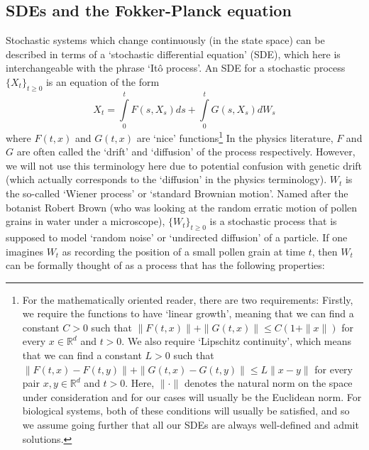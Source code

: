\subsection{SDEs and the Fokker-Planck equation}\label{intro_SDE}
Stochastic systems which change continuously (in the state space) can be described in terms of a `stochastic differential equation' (SDE), which here is interchangeable with the phrase `It\^o process'. An SDE for a stochastic process $\{X_t\}_{t \geq 0}$ is an equation of the form
\begin{equation}
\label{ito_SDE_integral}
X_t = \int\limits_{0}^{t} F(s,X_s)ds + \int\limits_{0}^{t} G(s,X_s)dW_s
\end{equation}
where $F(t,x)$ and $G(t,x)$ are `nice' functions\footnote{For the mathematically oriented reader, there are two requirements: Firstly, we require the functions to have `linear growth', meaning that we can find a constant $C > 0$ such that $\|F(t,x)\| + \|G(t,x)\| \leq C(1+\|x\|)$ for every $x \in \mathbb{R}^{d}$ and $t > 0$. We also require `Lipschitz continuity', which means that we can find a constant $L > 0$ such that $\|F(t,x) - F(t,y)\| + \|G(t,x)-G(t,y)\| \leq L\|x-y\|$ for every pair $x,y \in \mathbb{R}^d$ and $t > 0$. Here, $\|\cdot\|$ denotes the natural norm on the space under consideration and for our cases will usually be the Euclidean norm. For biological systems, both of these conditions will usually be satisfied, and so we assume going further that all our SDEs are always well-defined and admit solutions.} In the physics literature, $F$ and $G$ are often called the `drift' and `diffusion' of the process respectively. However, we will not use this terminology here due to  potential confusion with genetic drift (which actually corresponds to the `diffusion' in the physics terminology). $W_t$ is the so-called `Wiener process' or `standard Brownian motion'. Named after the botanist Robert Brown (who was looking at the random erratic motion of pollen grains in water under a microscope), $\{W_t\}_{t \geq 0}$ is a stochastic process that is supposed to model `random noise' or `undirected diffusion' of a particle. If one imagines $W_t$ as recording the position of a small pollen grain at time $t$, then $W_t$ can be formally thought of as a process that has the following properties:
